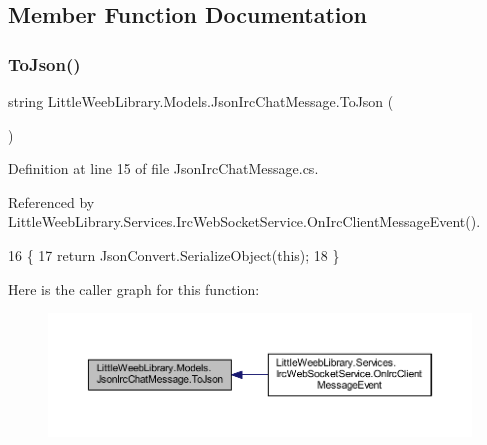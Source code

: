 \subsection{Member Function Documentation}
\mbox{\label{class_little_weeb_library_1_1_models_1_1_json_irc_chat_message_acbac803fd5e8ecffab5335a4069fc4b4}} 
\subsubsection{\texorpdfstring{To\+Json()}{ToJson()}}
{\footnotesize\ttfamily string Little\+Weeb\+Library.\+Models.\+Json\+Irc\+Chat\+Message.\+To\+Json (\begin{DoxyParamCaption}{ }\end{DoxyParamCaption})}



Definition at line 15 of file Json\+Irc\+Chat\+Message.\+cs.



Referenced by Little\+Weeb\+Library.\+Services.\+Irc\+Web\+Socket\+Service.\+On\+Irc\+Client\+Message\+Event().


\begin{DoxyCode}
16         \{
17             \textcolor{keywordflow}{return} JsonConvert.SerializeObject(\textcolor{keyword}{this});
18         \}
\end{DoxyCode}
Here is the caller graph for this function\+:\nopagebreak
\begin{figure}[H]
\begin{center}
\leavevmode
\includegraphics[width=350pt]{class_little_weeb_library_1_1_models_1_1_json_irc_chat_message_acbac803fd5e8ecffab5335a4069fc4b4_icgraph}
\end{center}
\end{figure}
\mbox{\label{class_little_weeb_library_1_1_models_1_1_json_irc_chat_message_ae54b09f8720f6ade5ed128496a4da690}} 
